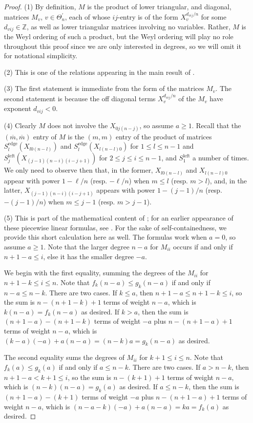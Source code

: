 \documentclass[12pt,
	]{amsart}
\theoremstyle{definition}
\renewcommand{\bar}{\overline}
\newcommand{\mrm}[1]{\mathrm{#1}}
\newcommand{\mbb}[1]{\mathbb{#1}}
\newcommand{\Z}{\mbb{Z}}
\newcommand{\discrete}{\Theta_n}
\newcommand{\cornerlessdiscrete}{\discrete^\prime}
\newcommand{\elemedgemat}[1]{S^\mrm{edge}_{#1}}
\newcommand{\elemleftmat}[1]{S^\mrm{left}_{#1}}
\begin{document}
\begin{proof}
(1)  By definition, $M$ is the product of lower triangular, and diagonal, matrices $M_v$, $v\in\cornerlessdiscrete$, each of whose $ij$-entry is of the form $X_v^{d_{vij}/n}$ for some $d_{vij}\in\Z$, as well as lower triangular matrices involving no variables.  Rather, $M$ is the Weyl ordering of such a product, but the Weyl ordering will play no role throughout this proof since we are only interested in degrees, so we will omit it for notational simplicity.  

(2)  This is one of the relations appearing in the main result of \cite{douglas2021points}. 

(3)  The first statement is immediate from the form of the matrices $M_v$.  The second statement is because the off diagonal terms $X_v^{d_{vij}/n}$ of the $M_v$ have exponent $d_{vij}<0$.

(4)  Clearly $M$ does not involve the $X_{0j(n-j)}$, so assume $a\geq1$.  Recall that the $(\bar{m},\bar{m})$ entry of $M$ is the $(m,m)$ entry of the product of matrices $\elemedgemat{l}(X_{l0(n-l)})$ and $\elemedgemat{l}(X_{l(n-l)0})$ for $1\leq l\leq n-1$ and $\elemleftmat{j}(X_{(j-1)(n-i)(i-j+1)})$ for $2\leq j\leq i\leq n-1$, and $\elemleftmat{1}$ a number of times.  We only need to observe then that, in the former, $X_{l0(n-l)}$ and $X_{l(n-l)0}$ appear with power $1-\ell/n$ (resp. $-\ell/n$) when $m\leq l$ (resp. $m>l$), and, in the latter, $X_{(j-1)(n-i)(i-j+1)}$ appears with power $1-(j-1)/n$ (resp. $-(j-1)/n$) when $m\leq j-1$ (resp. $m>j-1$).  

(5)  This is part of the mathematical content of \cite[Equation (172) and Theorem 10.2]{le2023quantum}; for an earlier appearance of these piecewise linear formulas, see \cite[Theorem 8.22]{SunGeomFunctAnal20}.  For the sake of self-containedness, we provide this short calculation here as well.   The formulas work when $a=0$, so assume $a\geq1$.  Note that the larger degree $n-a$ for $M_{ii}$ occurs if and only if $n+1-a\leq i$, else it has the smaller degree $-a$.  

We begin with the first equality, summing the degrees of the $M_{ii}$ for $n+1-k\leq i\leq n$.  Note that $f_k(n-a)\leq g_k(n-a)$ if and only if $n-a\leq n-k$.  There are two cases.  If $k\leq a$, then $n+1-a\leq n+1-k\leq i$, so the sum is $n-(n+1-k)+1$ terms of weight $n-a$, which is $k(n-a)=f_k(n-a)$ as desired.  If $k>a$, then the sum is $(n+1-a)-(n+1-k)$ terms of weight $-a$ plus $n-(n+1-a)+1$ terms of weight $n-a$, which is $(k-a)(-a)+a(n-a)=(n-k)a=g_k(n-a)$ as desired.  

The second equality sums the degrees of $M_{ii}$ for $k+1\leq i\leq n$.  Note that $f_k(a)\leq g_k(a)$ if and only if $a\leq n-k$.  There are two cases.  If $a>n-k$, then $n+1-a<k+1\leq i$, so the sum is $n-(k+1)+1$ terms of weight $n-a$, which is $(n-k)(n-a)=g_k(a)$ as desired.  If $a\leq n-k$, then the sum is $(n+1-a)-(k+1)$ terms of weight $-a$ plus $n-(n+1-a)+1$ terms of weight $n-a$, which is $(n-a-k)(-a)+a(n-a)=ka=f_k(a)$ as desired.  
\end{proof}
\end{document}

